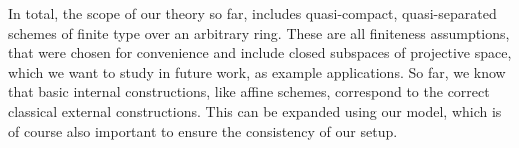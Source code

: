 \documentclass{../util/zariski}
\begin{document}
In total, the scope of our theory so far, includes quasi-compact, quasi-separated schemes of finite type over an arbitrary ring.
These are all finiteness assumptions, that were chosen for convenience and include closed subspaces of projective space,
which we want to study in future work, as example applications.
So far, we know that basic internal constructions, like affine schemes, correspond to the correct classical external constructions.
This can be expanded using our model, which is of course also important to ensure the consistency of our setup.

\printbibliography
\end{document}
